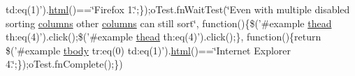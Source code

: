 \begin{DoxyCompactItemize}
td\+:eq(1)').\hyperlink{tinymce_8jquery_8dev_8js_ac2090bcf2ff968c0083d5de53a6544f3}{html}()==\char`\"{}Firefox 1.\char`\"{};\});o\+Test.\+fn\+Wait\+Test(\char`\"{}Even with multiple disabled sorting \hyperlink{model_8defaults_8columns_8js_af310571d7a4fac04bd949bdefb852a47}{columns} other \hyperlink{model_8defaults_8columns_8js_af310571d7a4fac04bd949bdefb852a47}{columns} can still sort\char`\"{}, function()\{\$('\#example \hyperlink{core_8constructor_8js_a856be760b6816c9591ce69f0a2b43693}{thead} th\+:eq(4)').click();\$('\#example \hyperlink{core_8constructor_8js_a856be760b6816c9591ce69f0a2b43693}{thead} th\+:eq(4)').click();\}, function()\{return \$('\#example \hyperlink{core_8constructor_8js_a99b0542c7c50fe8757c55bf9dac5f3be}{tbody} tr\+:eq(0) td\+:eq(1)').\hyperlink{tinymce_8jquery_8dev_8js_ac2090bcf2ff968c0083d5de53a6544f3}{html}()==\char`\"{}Internet Explorer 4.\char`\"{};\});o\+Test.\+fn\+Complete();\})
\end{DoxyCompactItemize}


